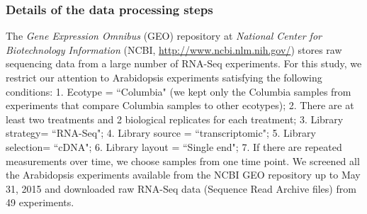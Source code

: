 \documentclass[fleqn,10pt,lineno]{wlpeerj} %
\begin{document}
\subsubsection{Details of the data processing steps}
The \textit{Gene Expression Omnibus} (GEO) repository at \textit{National
	Center for Biotechnology Information} (NCBI,
\url{http://www.ncbi.nlm.nih.gov/}) stores raw sequencing data from a large
number of RNA-Seq experiments.  For this study, we restrict our attention to
Arabidopsis experiments satisfying the following conditions: 1.  Ecotype =
``Columbia" (we kept only the Columbia samples from experiments that compare
Columbia samples to other ecotypes); 2. There are at least two treatments and 2 biological 
replicates for each
treatment; 3. Library strategy= ``RNA-Seq"; 4.
Library source = ``transcriptomic"; 5.  Library selection= ``cDNA"; 6.  Library
layout = ``Single end"; 7. If there are repeated measurements over time, we choose samples from one 
time point. We screened all the Arabidopsis experiments available from the NCBI
GEO repository up to May 31, 2015 and downloaded raw RNA-Seq data (Sequence Read Archive files)
from 49 experiments. %
\end{document}
